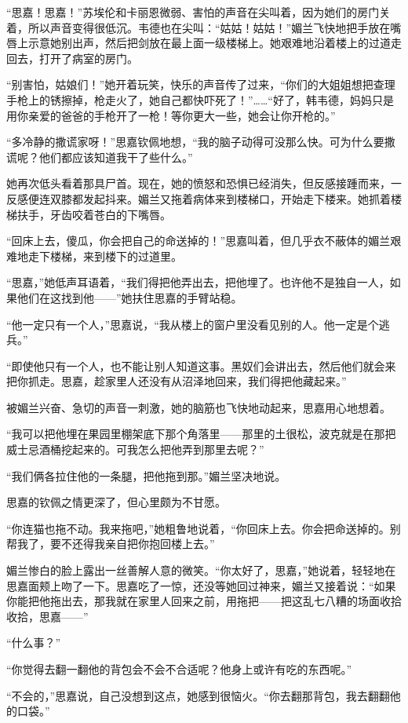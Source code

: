 \par “思嘉！思嘉！”苏埃伦和卡丽恩微弱、害怕的声音在尖叫着，因为她们的房门关着，所以声音变得很低沉。韦德也在尖叫：“姑姑！姑姑！”媚兰飞快地把手放在嘴唇上示意她别出声，然后把剑放在最上面一级楼梯上。她艰难地沿着楼上的过道走回去，打开了病室的房门。
\par “别害怕，姑娘们！”她开着玩笑，快乐的声音传了过来，“你们的大姐姐想把查理手枪上的锈擦掉，枪走火了，她自己都快吓死了！”……“好了，韩韦德，妈妈只是用你亲爱的爸爸的手枪开了一枪！等你更大一些，她会让你开枪的。”
\par “多冷静的撒谎家呀！”思嘉钦佩地想，“我的脑子动得可没那么快。可为什么要撒谎呢？他们都应该知道我干了些什么。”
\par 她再次低头看着那具尸首。现在，她的愤怒和恐惧已经消失，但反感接踵而来，一反感便连双膝都发起抖来。媚兰又拖着病体来到楼梯口，开始走下楼来。她抓着楼梯扶手，牙齿咬着苍白的下嘴唇。
\par “回床上去，傻瓜，你会把自己的命送掉的！”思嘉叫着，但几乎衣不蔽体的媚兰艰难地走下楼梯，来到楼下的过道里。
\par “思嘉，”她低声耳语着，“我们得把他弄出去，把他埋了。也许他不是独自一人，如果他们在这找到他——”她扶住思嘉的手臂站稳。
\par “他一定只有一个人，”思嘉说，“我从楼上的窗户里没看见别的人。他一定是个逃兵。”
\par “即使他只有一个人，也不能让别人知道这事。黑奴们会讲出去，然后他们就会来把你抓走。思嘉，趁家里人还没有从沼泽地回来，我们得把他藏起来。”
\par 被媚兰兴奋、急切的声音一刺激，她的脑筋也飞快地动起来，思嘉用心地想着。
\par “我可以把他埋在果园里棚架底下那个角落里——那里的土很松，波克就是在那把威士忌酒桶挖起来的。可我怎么把他弄到那里去呢？”
\par “我们俩各拉住他的一条腿，把他拖到那。”媚兰坚决地说。
\par 思嘉的钦佩之情更深了，但心里颇为不甘愿。
\par “你连猫也拖不动。我来拖吧，”她粗鲁地说着，“你回床上去。你会把命送掉的。别帮我了，要不还得我亲自把你抱回楼上去。”
\par 媚兰惨白的脸上露出一丝善解人意的微笑。“你太好了，思嘉，”她说着，轻轻地在思嘉面颊上吻了一下。思嘉吃了一惊，还没等她回过神来，媚兰又接着说：“如果你能把他拖出去，那我就在家里人回来之前，用拖把——把这乱七八糟的场面收拾收拾，思嘉——”
\par “什么事？”
\par “你觉得去翻一翻他的背包会不会不合适呢？他身上或许有吃的东西呢。”
\par “不会的，”思嘉说，自己没想到这点，她感到很恼火。“你去翻那背包，我去翻翻他的口袋。”
